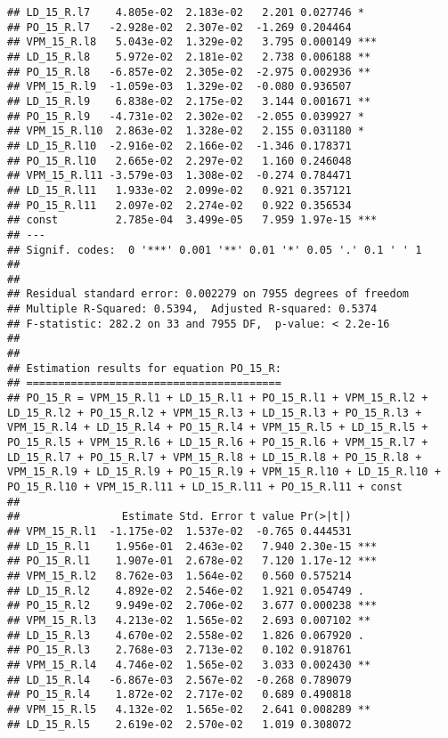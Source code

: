 \documentclass[
]{article}
\begin{document}
\begin{verbatim}
## LD_15_R.l7    4.805e-02  2.183e-02   2.201 0.027746 *  
## PO_15_R.l7   -2.928e-02  2.307e-02  -1.269 0.204464    
## VPM_15_R.l8   5.043e-02  1.329e-02   3.795 0.000149 ***
## LD_15_R.l8    5.972e-02  2.181e-02   2.738 0.006188 ** 
## PO_15_R.l8   -6.857e-02  2.305e-02  -2.975 0.002936 ** 
## VPM_15_R.l9  -1.059e-03  1.329e-02  -0.080 0.936507    
## LD_15_R.l9    6.838e-02  2.175e-02   3.144 0.001671 ** 
## PO_15_R.l9   -4.731e-02  2.302e-02  -2.055 0.039927 *  
## VPM_15_R.l10  2.863e-02  1.328e-02   2.155 0.031180 *  
## LD_15_R.l10  -2.916e-02  2.166e-02  -1.346 0.178371    
## PO_15_R.l10   2.665e-02  2.297e-02   1.160 0.246048    
## VPM_15_R.l11 -3.579e-03  1.308e-02  -0.274 0.784471    
## LD_15_R.l11   1.933e-02  2.099e-02   0.921 0.357121    
## PO_15_R.l11   2.097e-02  2.274e-02   0.922 0.356534    
## const         2.785e-04  3.499e-05   7.959 1.97e-15 ***
## ---
## Signif. codes:  0 '***' 0.001 '**' 0.01 '*' 0.05 '.' 0.1 ' ' 1
## 
## 
## Residual standard error: 0.002279 on 7955 degrees of freedom
## Multiple R-Squared: 0.5394,  Adjusted R-squared: 0.5374 
## F-statistic: 282.2 on 33 and 7955 DF,  p-value: < 2.2e-16 
## 
## 
## Estimation results for equation PO_15_R: 
## ======================================== 
## PO_15_R = VPM_15_R.l1 + LD_15_R.l1 + PO_15_R.l1 + VPM_15_R.l2 + LD_15_R.l2 + PO_15_R.l2 + VPM_15_R.l3 + LD_15_R.l3 + PO_15_R.l3 + VPM_15_R.l4 + LD_15_R.l4 + PO_15_R.l4 + VPM_15_R.l5 + LD_15_R.l5 + PO_15_R.l5 + VPM_15_R.l6 + LD_15_R.l6 + PO_15_R.l6 + VPM_15_R.l7 + LD_15_R.l7 + PO_15_R.l7 + VPM_15_R.l8 + LD_15_R.l8 + PO_15_R.l8 + VPM_15_R.l9 + LD_15_R.l9 + PO_15_R.l9 + VPM_15_R.l10 + LD_15_R.l10 + PO_15_R.l10 + VPM_15_R.l11 + LD_15_R.l11 + PO_15_R.l11 + const 
## 
##                Estimate Std. Error t value Pr(>|t|)    
## VPM_15_R.l1  -1.175e-02  1.537e-02  -0.765 0.444531    
## LD_15_R.l1    1.956e-01  2.463e-02   7.940 2.30e-15 ***
## PO_15_R.l1    1.907e-01  2.678e-02   7.120 1.17e-12 ***
## VPM_15_R.l2   8.762e-03  1.564e-02   0.560 0.575214    
## LD_15_R.l2    4.892e-02  2.546e-02   1.921 0.054749 .  
## PO_15_R.l2    9.949e-02  2.706e-02   3.677 0.000238 ***
## VPM_15_R.l3   4.213e-02  1.565e-02   2.693 0.007102 ** 
## LD_15_R.l3    4.670e-02  2.558e-02   1.826 0.067920 .  
## PO_15_R.l3    2.768e-03  2.713e-02   0.102 0.918761    
## VPM_15_R.l4   4.746e-02  1.565e-02   3.033 0.002430 ** 
## LD_15_R.l4   -6.867e-03  2.567e-02  -0.268 0.789079    
## PO_15_R.l4    1.872e-02  2.717e-02   0.689 0.490818    
## VPM_15_R.l5   4.132e-02  1.565e-02   2.641 0.008289 ** 
## LD_15_R.l5    2.619e-02  2.570e-02   1.019 0.308072    

\end{verbatim}
\end{document}
